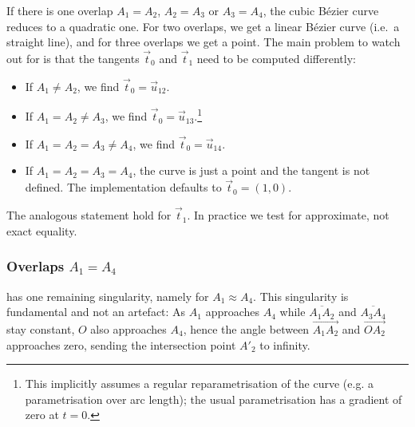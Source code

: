 \documentclass[12pt,a4paper]{article}
\theoremstyle{definition}
\newcommand{\tv}{\vec{t}}
\newcommand{\uv}{\vec{u}}
\begin{document}
If there is one overlap $A_1=A_2$, $A_2=A_3$ or $A_3=A_4$, the cubic Bézier curve reduces to a quadratic one. For two overlaps, we get a linear Bézier curve (i.e.\ a straight line), and for three overlaps we get a point. The main problem to watch out for is that the tangents $\tv_0$ and $\tv_1$ need to be computed differently:
\begin{itemize}
  \item If $A_1 \neq A_2$, we find $\tv_0 = \uv_{12}$.
  \item If $A_1 = A_2 \neq A_3$, we find $\tv_0 = \uv_{13}$.\footnote{This implicitly assumes a regular reparametrisation of the curve (e.g. a parametrisation over arc length); the usual parametrisation has a gradient of zero at $t=0$.}
  \item If $A_1 = A_2 = A_3 \neq A_4$, we find $\tv_0 = \uv_{14}$.
  \item If $A_1 = A_2 = A_3 = A_4$, the curve is just a point and the tangent is not defined. The implementation defaults to $\tv_0 = (1,0)$.
\end{itemize}
The analogous statement hold for $\tv_1$. In practice we test for approximate, not exact equality.

\subsubsection{Overlaps $A_1 = A_4$}

 has one remaining singularity, namely for $A_1 \approx A_4$. This singularity is fundamental and not an artefact: As $A_1$ approaches $A_4$ while $\overline{A_1A_2}$ and $\overline{A_3A_4}$ stay constant, $O$ also approaches $A_4$, hence the angle between $\overrightarrow{A_1A_2}$ and $\overrightarrow{OA_2}$ approaches zero, sending the intersection point $A'_2$ to infinity.
\end{document}
